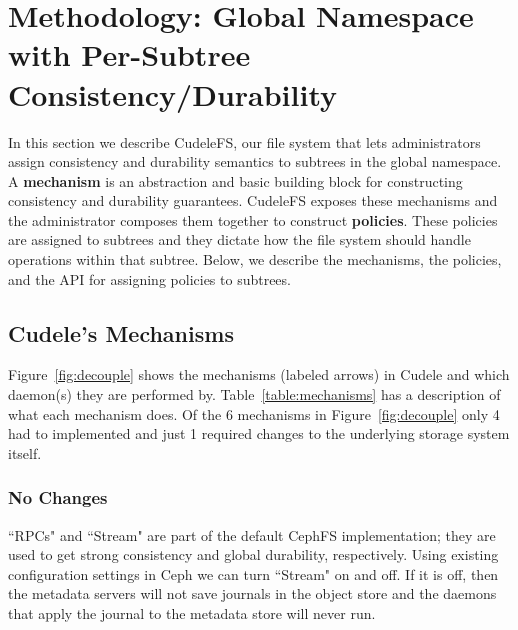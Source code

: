 \section{Methodology: Global Namespace with Per-Subtree Consistency/Durability}
\label{sec:methodology-decoupled-namespaces}

In this section we describe CudeleFS, our file system that lets administrators
assign consistency and durability semantics to subtrees in the global
namespace. A \textbf{mechanism} is an abstraction and basic building block for
constructing consistency and durability guarantees. CudeleFS exposes these
mechanisms and the administrator composes them together to construct
\textbf{policies}. These policies are assigned to subtrees and they dictate how
the file system should handle operations within that subtree.  Below, we
describe the mechanisms, the policies, and the API for assigning policies to
subtrees.

\subsection{Cudele's Mechanisms}
\label{sec:cudeles-mechanisms}

Figure~\ref{fig:decouple} shows the mechanisms (labeled arrows) in Cudele and
which daemon(s) they are performed by.  Table~\ref{table:mechanisms} has a
description of what each mechanism does.  Of the 6 mechanisms in
Figure~\ref{fig:decouple} only 4 had to implemented and just 1 required changes to
the underlying storage system itself.

\subsubsection{No Changes} ``RPCs" and ``Stream" are part of the default CephFS
implementation; they are used to get strong consistency and global durability,
respectively.  Using existing configuration settings in Ceph we can turn
``Stream" on and off.  If it is off, then the metadata servers will not save
journals in the object store and the daemons that apply the journal to the
metadata store will never run.


